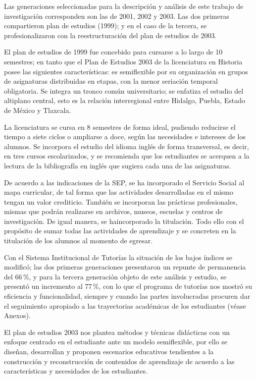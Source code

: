 Las generaciones seleccionadas para la descripción y  análisis de este trabajo de investigación corresponden son las de 2001, 2002 y 2003. Las dos primeras compartieron plan de estudios (1999); y en el caso de la tercera, se profesionalizaron con la reestructuración del plan de estudios de 2003. 

El plan de estudios de 1999 fue concebido para cursarse a lo largo de 10 semestres;  en tanto que el Plan de Estudios 2003 de la licenciatura en Historia posee las siguientes características: es semiflexible por su organización en grupos de asignaturas distribuidas en etapas, con la menor seriación temporal obligatoria. Se integra un tronco común universitario; se enfatiza el estudio del  altiplano central, esto es la relación interregional entre Hidalgo, Puebla, Estado de México y Tlaxcala.

La licenciatura se cursa en 8 semestres de forma ideal, pudiendo reducirse el tiempo a siete ciclos o ampliarse a doce, según las necesidades e intereses de los alumnos. Se incorpora el estudio del idioma inglés de forma transversal, es decir, en tres cursos escolarizados, y se recomienda que los estudiantes se acerquen a la lectura de la bibliografía en inglés que sugiera cada una de las asignaturas.

\enlargethispage{1\baselineskip}
De acuerdo a las indicaciones de la SEP, se ha incorporado el Servicio Social al mapa curricular, de tal forma que las actividades desarrolladas en el mismo tengan un valor crediticio. También se incorporan  las prácticas profesionales, mismas que podrán realizarse  en archivos, museos, escuelas y centros de investigación. De igual manera, se ha\linebreak incorporado  la titulación. Todo ello con el propósito de sumar todas las actividades de aprendizaje y se concreten en la titulación de los alumnos al momento de egresar.

Con el Sistema Institucional de Tutorías la situación de los bajos índices se modificó; las dos primeras generaciones presentaron un repunte de permanencia del 66\,\%, y para la tercera generación objeto de este análisis y estudio,  se presentó un incremento al 
77\,\%, con  lo que el programa de tutorías nos mostró su eficiencia y  funcionalidad,  siempre y cuando las partes involucradas  procuren dar el seguimiento apropiado a las trayectorias académicas de los estudiantes (véase Anexos).

El plan de estudios 2003 nos plantea métodos y técnicas didácticas con un enfoque centrado en el estudiante ante un modelo semiflexible, por ello se  diseñan, desarrollan y proponen escenarios educativos tendientes a la construcción y reconstrucción de contenidos de aprendizaje de  acuerdo a las características y necesidades de los estudiantes.

